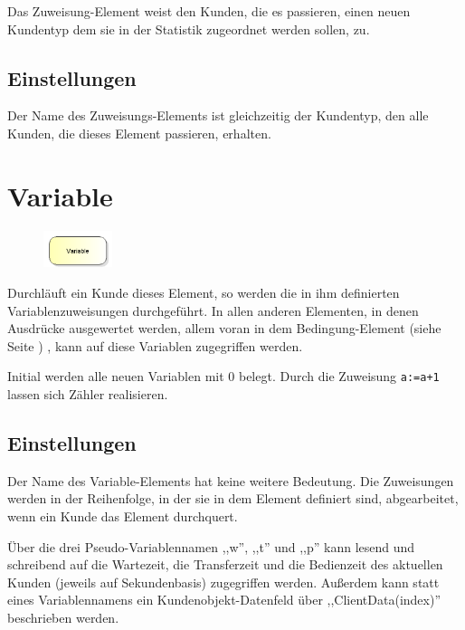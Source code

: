 Das Zuweisung-Element weist den Kunden, die es passieren, einen neuen Kundentyp dem sie in der Statistik zugeordnet werden sollen, zu.

\subsection*{Einstellungen}

Der Name des Zuweisungs-Elements ist gleichzeitig der Kundentyp, den alle Kunden, die dieses Element passieren, erhalten.


\section{Variable}
\label{ref:ModelElementSet}

\begin{figure}
\vspace{-22pt}
\includegraphics[width=2cm]{imageModelElementSet.png}
\vspace{-22pt}
\end{figure}

Durchläuft ein Kunde dieses Element, so werden die in ihm definierten Variablenzuweisungen durchgeführt.
In allen anderen Elementen, in denen Ausdrücke ausgewertet werden, allem voran in dem
Bedingung-Element (siehe Seite \pageref{ref:ModelElementHold}) , kann auf diese Variablen zugegriffen werden.

Initial werden alle neuen Variablen mit 0 belegt. Durch die Zuweisung \texttt{a:=a+1} lassen sich
Zähler realisieren.

\subsection*{Einstellungen}

Der Name des Variable-Elements hat keine weitere Bedeutung. Die Zuweisungen werden in der Reihenfolge, in der
sie in dem Element definiert sind, abgearbeitet, wenn ein Kunde das Element durchquert.

Über die drei Pseudo-Variablennamen ,,w'', ,,t'' und ,,p'' kann lesend und schreibend auf die Wartezeit, die Transferzeit
und die Bedienzeit des aktuellen Kunden (jeweils auf Sekundenbasis) zugegriffen werden. Außerdem kann statt eines
Variablennamens ein Kundenobjekt-Datenfeld über ,,ClientData(index)'' beschrieben werden.

